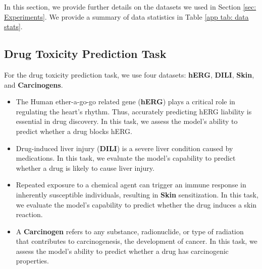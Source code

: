 In this section, we provide further details on the datasets we used in Section \ref{sec: Experiments}.
We provide a summary of data statistics in Table \ref{app tab: data stats}.



\subsection{Drug Toxicity Prediction Task}
For the drug toxicity prediction task, we use four datasets: \textbf{hERG}, \textbf{DILI}, \textbf{Skin}, and \textbf{Carcinogens}.
\begin{itemize}[leftmargin=.1in]
\item The Human ether-a-go-go related gene (\textbf{hERG}) \cite{wang2016admet} plays a critical role in regulating the heart's rhythm. Thus, accurately predicting hERG liability is essential in drug discovery. In this task, we assess the model's ability to predict whether a drug blocks hERG.
\item Drug-induced liver injury (\textbf{DILI}) \cite{xu2015deep} is a severe liver condition caused by medications. In this task, we evaluate the model's capability to predict whether a drug is likely to cause liver injury.
\item Repeated exposure to a chemical agent can trigger an immune response in inherently susceptible individuals, resulting in \textbf{Skin} \cite{alves2015predicting} sensitization. In this task, we evaluate the model's capability to predict whether the drug induces a skin reaction.
\item A \textbf{Carcinogen} \cite{lagunin2009computer} refers to any substance, radionuclide, or type of radiation that contributes to carcinogenesis, the development of cancer. In this task, we assess the model's ability to predict whether a drug has carcinogenic properties.
\end{itemize}

